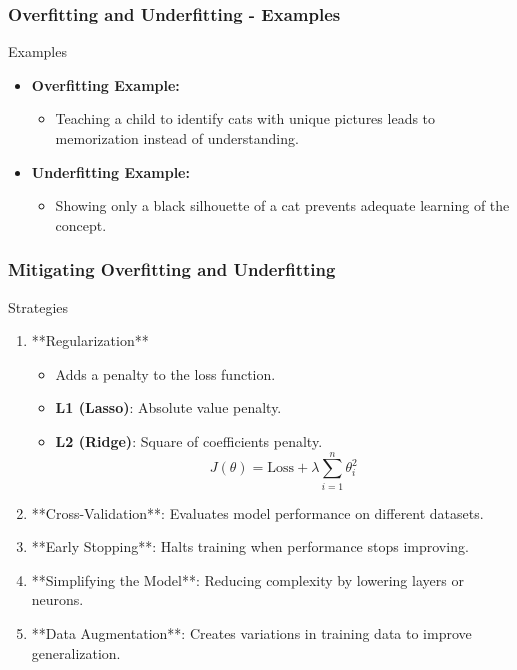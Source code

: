 \documentclass[aspectratio=169]{beamer}
\begin{document}
\begin{frame}[fragile]
    \frametitle{Overfitting and Underfitting - Examples}
    \begin{block}{Examples}
        \begin{itemize}
            \item \textbf{Overfitting Example:} 
            \begin{itemize}
                \item Teaching a child to identify cats with unique pictures leads to memorization instead of understanding.
            \end{itemize}
            
            \item \textbf{Underfitting Example:} 
            \begin{itemize}
                \item Showing only a black silhouette of a cat prevents adequate learning of the concept.
            \end{itemize}
        \end{itemize}
    \end{block}
\end{frame}

\begin{frame}[fragile]
    \frametitle{Mitigating Overfitting and Underfitting}
    \begin{block}{Strategies}
        \begin{enumerate}
            \item **Regularization**
                \begin{itemize}
                    \item Adds a penalty to the loss function.
                    \item \textbf{L1 (Lasso)}: Absolute value penalty.
                    \item \textbf{L2 (Ridge)}: Square of coefficients penalty.
                    \begin{equation}
                        J(\theta) = \text{Loss} + \lambda \sum_{i=1}^{n} \theta_i^2
                    \end{equation}
                \end{itemize}
            \item **Cross-Validation**: Evaluates model performance on different datasets.
            \item **Early Stopping**: Halts training when performance stops improving.
            \item **Simplifying the Model**: Reducing complexity by lowering layers or neurons.
            \item **Data Augmentation**: Creates variations in training data to improve generalization.
        \end{enumerate}
    \end{block}
\end{frame}
\end{document}
